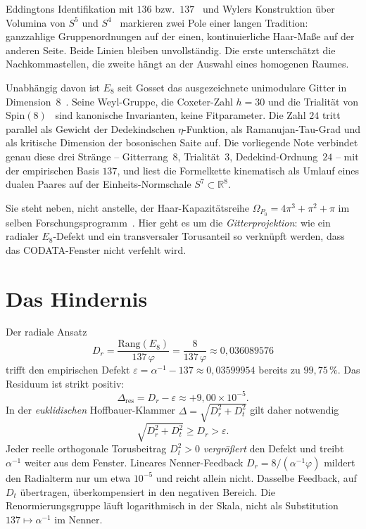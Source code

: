 \documentclass[11pt,a4paper]{article}
\begin{document}
Eddingtons Identifikation mit $136$ bzw.\ $137$~\cite{eddington1936} und Wylers Konstruktion über Volumina von $S^5$ und $S^4$~\cite{wyler1969}
markieren zwei Pole einer langen Tradition: ganzzahlige Gruppenordnungen auf der einen, kontinuierliche Haar-Maße auf der anderen Seite.
Beide Linien bleiben unvollständig.
Die erste unterschätzt die Nachkommastellen, die zweite hängt an der Auswahl eines homogenen Raumes.

Unabhängig davon ist $E_8$ seit Gosset das ausgezeichnete unimodulare Gitter in Dimension~$8$~\cite{conwaysloane}.
Seine Weyl-Gruppe, die Coxeter-Zahl $h=30$ und die Trialität von $\mathrm{Spin}(8)$~\cite{adams} sind kanonische Invarianten, keine Fitparameter.
Die Zahl $24$ tritt parallel als Gewicht der Dedekindschen $\eta$-Funktion, als Ramanujan-Tau-Grad und als kritische Dimension der bosonischen Saite auf.
Die vorliegende Note verbindet genau diese drei Stränge -- Gitterrang~$8$, Trialität~$3$, Dedekind-Ordnung~$24$ -- mit der empirischen Basis $137$, und liest die Formelkette kinematisch als Umlauf eines dualen Paares auf der Einheits-Normschale $S^7\subset\mathbb{R}^8$.

Sie steht neben, nicht anstelle, der Haar-Kapazitätsreihe
$\Omega_{P_0}=4\pi^3+\pi^2+\pi$ im selben Forschungsprogramm~\cite{hoffbauer2026haar}.
Hier geht es um die \emph{Gitterprojektion}: wie ein radialer $E_8$-Defekt und ein transversaler Torusanteil so verknüpft werden, dass das CODATA-Fenster nicht verfehlt wird.

\section{Das Hindernis}

Der radiale Ansatz
\begin{equation}
D_r=\frac{\mathrm{Rang}(E_8)}{137\,\varphi}=\frac{8}{137\,\varphi}\approx 0{,}036089576
\end{equation}
trifft den empirischen Defekt $\varepsilon=\alpha^{-1}-137\approx 0{,}03599954$ bereits zu $99{,}75\,\%$.
Das Residuum ist strikt positiv:
\begin{equation}
\Delta_{\mathrm{res}}=D_r-\varepsilon\approx +9{,}00\times 10^{-5}.
\end{equation}
In der \emph{euklidischen} Hoffbauer-Klammer
$\Delta=\sqrt{D_r^2+D_t^2}$ gilt daher notwendig
\begin{equation}
\sqrt{D_r^2+D_t^2}\ge D_r>\varepsilon.
\end{equation}
Jeder reelle orthogonale Torusbeitrag $D_t^2>0$ \emph{vergrößert} den Defekt und treibt $\alpha^{-1}$ weiter aus dem Fenster.
Lineares Nenner-Feedback $D_r=8/(\alpha^{-1}\varphi)$ mildert den Radialterm nur um etwa $10^{-5}$ und reicht allein nicht.
Dasselbe Feedback, auf $D_t$ übertragen, überkompensiert in den negativen Bereich.
Die Renormierungsgruppe läuft logarithmisch in der Skala, nicht als Substitution $137\mapsto\alpha^{-1}$ im Nenner.
\end{document}
